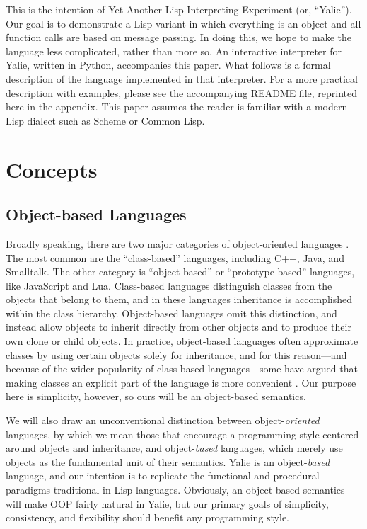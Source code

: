 \documentclass[twocolumn]{article}
\begin{document}
This is the intention of Yet Another Lisp Interpreting Experiment (or,
``Yalie''). Our goal is to demonstrate a Lisp variant in which
everything is an object and all function calls are based on message
passing. In doing this, we hope to make the language less complicated,
rather than more so. An interactive interpreter for Yalie, written in
Python, accompanies this paper. What follows is a formal description
of the language implemented in that interpreter. For a more practical
description with examples, please see the accompanying README file,
reprinted here in the appendix. This paper assumes the reader is
familiar with a modern Lisp dialect such as Scheme or Common Lisp.

\section*{Concepts}
\subsection*{Object-based Languages}
Broadly speaking, there are two major categories of object-oriented
languages \cite{Abadi}. The most common are the ``class-based''
languages, including C++, Java, and Smalltalk. The other category is
``object-based'' or ``prototype-based'' languages, like JavaScript and
Lua. Class-based languages distinguish classes from the objects that
belong to them, and in these languages inheritance is accomplished
within the class hierarchy. Object-based languages omit this
distinction, and instead allow objects to inherit directly from other
objects and to produce their own clone or child objects. In practice,
object-based languages often approximate classes by using certain
objects solely for inheritance, and for this reason---and because of
the wider popularity of class-based languages---some have argued that
making classes an explicit part of the language is more
convenient \cite{Bruce}. Our purpose here is simplicity, however, so
ours will be an object-based semantics.

We will also draw an unconventional distinction between
object-\emph{oriented} languages, by which we mean those that
encourage a programming style centered around objects and inheritance,
and object-\emph{based} languages, which merely use objects as the
fundamental unit of their semantics. Yalie is an object-\emph{based}
language, and our intention is to replicate the functional and
procedural paradigms traditional in Lisp languages. Obviously, an
object-based semantics will make OOP fairly natural in Yalie, but our
primary goals of simplicity, consistency, and flexibility should
benefit any programming style.
\end{document}

